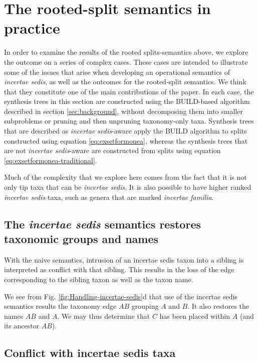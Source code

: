 \documentclass[english]{article}
\begin{document}
\section{The rooted-split semantics in practice}

In order to examine the results of the rooted splits-semantics above, we explore
the outcome on a series of complex cases.  These cases are intended to
illustrate some of the issues that arise when developing an operational semantics of
\emph{incertae sedis}, as well as the outcomes for the rooted-split semantics.
We think that they constitute one of the main contributions of the paper.  In
each case, the synthesis trees in this section are constructed using the
BUILD-based algorithm described in section \ref{sec:background}, without
decomposing them into smaller subproblems or pruning and then unpruning
taxonomy-only taxa.  Synthesis trees that are described as \emph{incertae
sedis}-aware apply the BUILD algorithm to splits constructed using equation
\ref{eq:exsetformonea}, whereas the synthesis trees that are not \emph{incertae
sedis}-aware are constructed from splits using equation
\ref{eq:exsetformonea-traditional}.

Much of the complexity that we explore here comes from the fact that it is not
only tip taxa that can be \emph{incertae sedis}.  It is also possible to have
higher ranked  \emph{incertae sedis} taxa, such as genera that are marked
\emph{incertae familia}.

\subsection{The \emph{incertae sedis} semantics restores taxonomic groups and names}

With the naive semantics, intrusion of an incertae sedis taxon into a sibling is
interpreted as conflict with that sibling.  This results in the loss of the edge
corresponding to the sibling taxon as well as the taxon name.

We see from Fig. \ref{fig:Handling-incertae-sedis}d that use of the incertae sedis
semantics results the taxonomy edge $AB$ grouping $A$ and $B$.  It also restores the
names $AB$ and $A$.  We may thus determine that $C$ has been placed within $A$ (and
its ancestor $AB$).

\subsection{Conflict with incertae sedis taxa}
\end{document}
